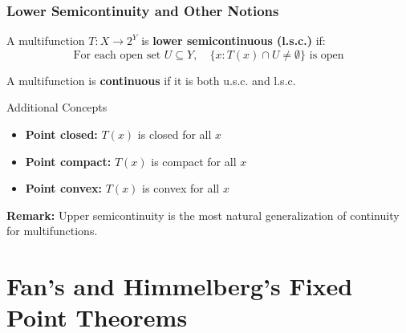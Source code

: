 \documentclass[aspectratio=169,10pt]{beamer}
\begin{document}
\begin{frame}
\frametitle{Lower Semicontinuity and Other Notions}

\begin{definition}
A multifunction $T: X \to 2^Y$ is \textbf{lower semicontinuous (l.s.c.)} if:
\[
\text{For each open set } U \subseteq Y, \quad \{x : T(x) \cap U \neq \emptyset\} \text{ is open}
\]
\end{definition}

\vspace{0.3cm}

A multifunction is \textbf{continuous} if it is both u.s.c. and l.s.c.

\vspace{0.3cm}

\begin{block}{Additional Concepts}
\begin{itemize}
    \item \textbf{Point closed:} $T(x)$ is closed for all $x$
    \item \textbf{Point compact:} $T(x)$ is compact for all $x$
    \item \textbf{Point convex:} $T(x)$ is convex for all $x$
\end{itemize}
\end{block}

\vspace{0.3cm}

\textbf{Remark:} Upper semicontinuity is the most natural generalization of continuity for multifunctions.

\end{frame}


\section{Fan's and Himmelberg's Fixed Point Theorems}
\end{document}
